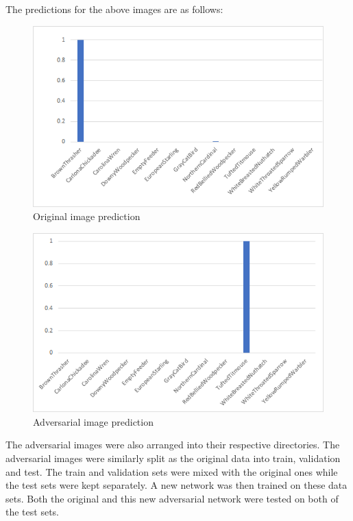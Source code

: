 \documentclass[11pt]{article}
\begin{document}
The predictions for the above images are as follows:
\begin{figure}[H]
\centering
\includegraphics[scale=1.0]{images/Original_predictions.png}
\caption{Original image prediction}
\end{figure}
\begin{figure}[H]
\centering
\includegraphics[scale=1.0]{images/Adversarial_predictions.png}
\caption{Adversarial image prediction}
\end{figure}

\noindent The adversarial images were also arranged into their respective directories. The adversarial images were similarly split as the original data into train, validation and test. The train and validation sets were mixed with the original ones while the test sets were kept separately. A new network was then trained on these data sets. Both the original and this new adversarial network were tested on both of the test sets.
\end{document}
